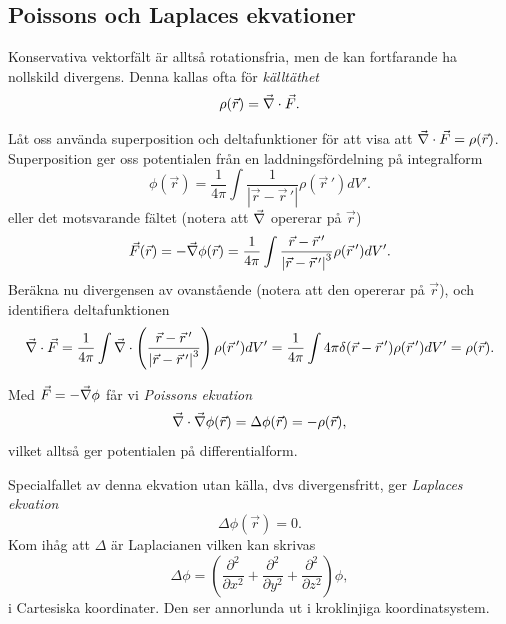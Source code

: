 \documentclass[%
oneside,                 %
final,                   %
10pt]{article}
\newenvironment{warning_mdfboxadmon}[1][]{
\begin{warning_mdfboxmdframed}[frametitle=#1]
}
{
\end{warning_mdfboxmdframed}
}
\begin{document}
\subsection*{Poissons och Laplaces ekvationer}

Konservativa vektorfält är alltså rotationsfria, men de kan fortfarande ha nollskild divergens. Denna kallas ofta för \emph{källtäthet}
\begin{equation}
\rho(\vec{r}) = \vec{\nabla} \cdot \vec{F}.
\end{equation}


\begin{warning_mdfboxadmon}[Kommentar]
Låt oss använda superposition och deltafunktioner för att visa att $\vec{\nabla} \cdot \vec{F} = \rho(\vec{r})$. Superposition ger oss potentialen från en laddningsfördelning på integralform
$$
\phi(\vec{r}) = \frac{1}{4\pi} \int \frac{1}{\left| \vec{r} - \vec{r}\,' \right|} \rho(\vec{r}\,') dV'.
$$
eller det motsvarande fältet (notera att $\vec{\nabla}$ opererar på $\vec{r}$)
$$
\vec{F}(\vec{r}) = -\vec{\nabla} \phi(\vec{r}) = \frac{1}{4\pi} \int \frac{\vec{r} - \vec{r}\,'}{\left| \vec{r} - \vec{r}\,' \right|^3} \rho(\vec{r}\,') dV'.
$$
Beräkna nu divergensen av ovanstående (notera att den opererar på $\vec{r}$), och identifiera deltafunktionen
$$
\vec{\nabla} \cdot \vec{F} = \frac{1}{4\pi} \int \vec{\nabla} \cdot \left( \frac{\vec{r} - \vec{r}\,'}{\left| \vec{r} - \vec{r}\,' \right|^3}\right) \rho(\vec{r}\,') dV'
= \frac{1}{4\pi} \int 4\pi \delta( \vec{r} - \vec{r}\,' ) \rho(\vec{r}\,') dV' = \rho(\vec{r}).
$$
\end{warning_mdfboxadmon} %




Med $\vec{F} = -\vec{\nabla} \phi$ får vi \emph{Poissons ekvation}
\begin{equation}
\vec{\nabla} \cdot \vec{\nabla} \phi(\vec{r}) = \Delta \phi(\vec{r}) = -\rho(\vec{r}),
\end{equation}
vilket alltså ger potentialen på differentialform.

Specialfallet av denna ekvation utan källa, dvs divergensfritt, ger \emph{Laplaces ekvation}
\begin{equation}
\Delta \phi(\vec{r}) = 0.
\end{equation}
Kom ihåg att $\Delta$ är Laplacianen vilken kan skrivas
\begin{equation}
\Delta \phi = \left( \frac{\partial^2}{\partial x^2} + \frac{\partial^2}{\partial y^2} + \frac{\partial^2}{\partial z^2} \right) \phi,
\end{equation}
i Cartesiska koordinater. Den ser annorlunda ut i kroklinjiga koordinatsystem.
\end{document}

